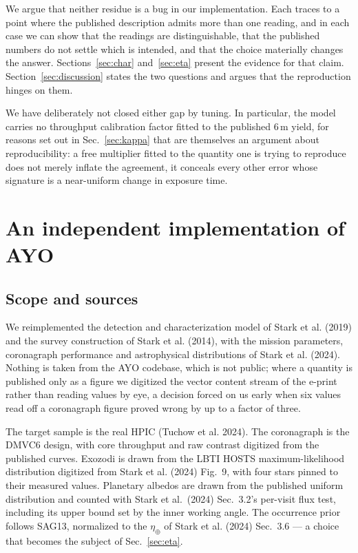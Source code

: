 \documentclass[11pt,a4paper]{article}
\begin{document}
We argue that neither residue is a bug in our implementation. Each traces to a point where the
published description admits more than one reading, and in each case we can show that the
readings are distinguishable, that the published numbers do not settle which is intended, and
that the choice materially changes the answer. Sections~\ref{sec:char} and~\ref{sec:eta} present
the evidence for that claim. Section~\ref{sec:discussion} states the two questions and argues
that the reproduction hinges on them.

We have deliberately not closed either gap by tuning. In particular, the model carries no
throughput calibration factor fitted to the published $6\,$m yield, for reasons set out in
Sec.~\ref{sec:kappa} that are themselves an argument about reproducibility: a free multiplier
fitted to the quantity one is trying to reproduce does not merely inflate the agreement, it
conceals every other error whose signature is a near-uniform change in exposure time.

\section{An independent implementation of AYO}
\label{sec:model}

\subsection{Scope and sources}

We reimplemented the detection and characterization model of Stark et al. (2019) and the survey
construction of Stark et al. (2014), with the mission parameters, coronagraph performance and
astrophysical distributions of Stark et al. (2024). Nothing is taken from the AYO codebase, which
is not public; where a quantity is published only as a figure we digitized the vector content
stream of the e-print rather than reading values by eye, a decision forced on us early when six
values read off a coronagraph figure proved wrong by up to a factor of three.

The target sample is the real HPIC (Tuchow et al. 2024). The coronagraph is the DMVC6 design, with
core throughput and raw contrast digitized from the published curves. Exozodi is drawn from the
LBTI HOSTS maximum-likelihood distribution digitized from Stark et al. (2024) Fig.~9, with four
stars pinned to their measured values. Planetary albedos are drawn from the published uniform
distribution and counted with Stark et al.\ (2024) Sec.~3.2's per-visit flux test, including its
upper bound set by the inner working angle. The occurrence prior follows SAG13, normalized to the
$\eta_\oplus$ of Stark et al. (2024) Sec.~3.6 --- a choice that becomes the subject of
Sec.~\ref{sec:eta}.
\end{document}
